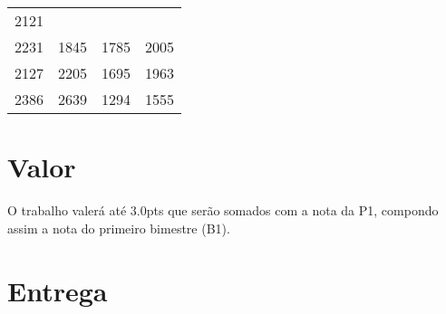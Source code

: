 \documentclass[a4paper]{article}
\begin{document}
\begin{longtable}[c]{@{}cccc@{}}
\begin{minipage}[t]{0.06\columnwidth}
2121
\strut\end{minipage}\tabularnewline
\begin{minipage}[t]{0.06\columnwidth}\centering\strut
2231
\strut\end{minipage} &
\begin{minipage}[t]{0.06\columnwidth}\centering\strut
1845
\strut\end{minipage} &
\begin{minipage}[t]{0.06\columnwidth}\centering\strut
1785
\strut\end{minipage} &
\begin{minipage}[t]{0.06\columnwidth}\centering\strut
2005
\strut\end{minipage}\tabularnewline
\begin{minipage}[t]{0.06\columnwidth}\centering\strut
2127
\strut\end{minipage} &
\begin{minipage}[t]{0.06\columnwidth}\centering\strut
2205
\strut\end{minipage} &
\begin{minipage}[t]{0.06\columnwidth}\centering\strut
1695
\strut\end{minipage} &
\begin{minipage}[t]{0.06\columnwidth}\centering\strut
1963
\strut\end{minipage}\tabularnewline
\begin{minipage}[t]{0.06\columnwidth}\centering\strut
2386
\strut\end{minipage} &
\begin{minipage}[t]{0.06\columnwidth}\centering\strut
2639
\strut\end{minipage} &
\begin{minipage}[t]{0.06\columnwidth}\centering\strut
1294
\strut\end{minipage} &
\begin{minipage}[t]{0.06\columnwidth}\centering\strut
1555
\strut\end{minipage}\tabularnewline
\bottomrule
\end{longtable}

\section{Valor}
O trabalho valerá até $3.0$pts que serão somados com a nota da P1, compondo assim a nota do primeiro bimestre (B1).

\section{Entrega}
\end{document}
